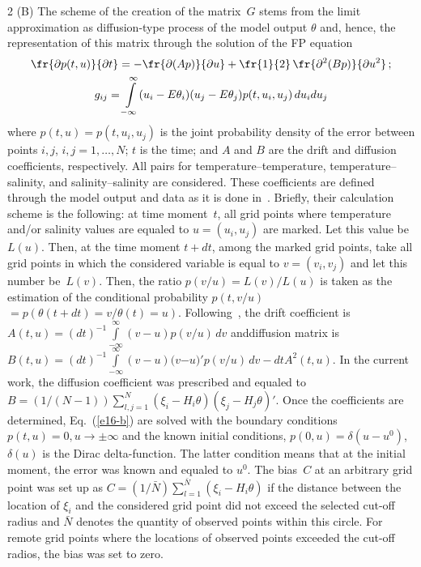 \begin{multicols}{2}
(B) The scheme of the creation of the matrix~$G$ stems from the limit approximation 
as diffusion-type process of the model output $\theta $ and, hence, the representation 
of this matrix through the solution of the FP equation
\begin{gather}
\fr{\partial p(t,u)}{\partial t} =-\fr{\partial (Ap)}{\partial u} +\fr{1}{2}\,
\fr{\partial ^{2} (Bp)}{\partial u^{2} } \,;
\label{e16-b}
\\
g_{ij} =\int\limits_{-\infty }^{\infty }(u_{i} -E\theta_{i}  )
(u_{j} -E\theta_{j} )p(t,u_{i} ,u_{j} )\,du_{i} du_{j} \notag
\end{gather}
where $p(t,u)=p(t,u_{i} ,u_{j} )$ is the joint probability density of the error between 
points $i,j$, $i,j=1,\ldots ,N$; $t$ is the time; and $A$ and $B$ are the drift and diffusion 
coefficients, respectively. All pairs for temperature--temperature, temperature--salinity, 
and salinity--salinity are considered. These coefficients are defined through the model 
output and data as it is done in~\cite{6-b}. Briefly, their calculation scheme is the following: 
at time moment~$t$, all grid points where temperature and/or salinity values are equaled 
to $u=(u_{i} ,u_{j} )$ are marked. Let this value be $L(u)$. Then, at the time moment
$t +dt$, among the marked grid points, take all grid points in which the considered 
variable is equal to $v=(v_{i} ,v_{j} )$ and let this number be~$L(v)$. 
Then, the ratio ${p(v/u)=L(v)/L(u)}$ is taken as the\linebreak
estimation of the conditional 
probability $p(t,v/u)$\linebreak $=p(\theta (t+dt)=v/\theta (t)=u).$ 
Following~\cite{4-b}, the drift coefficient is 
$A(t,u)=(dt)^{-1} \int\limits_{-\infty }^{\infty }(v-u )p(v/u)\,dv$ 
and\linebreak diffusion matrix is $B(t,u)=(dt)^{-1} \int\limits_{-\infty }^{\infty }
(v-u )(v$\linebreak $-u)'p(v/u)\,dv- dtA^{2} (t,u)$.
In the current work, the diffusion coefficient was prescribed and 
equaled to $B=({1}/(N-1)) \sum\limits_{l,j=1}^{N}(\xi_{i}  -H_{i} \theta )(\xi_{j} -H_{j} 
\theta )'$. Once the coefficients are determined, Eq.~(\ref{e16-b}) are solved with the boundary 
conditions $p(t,u)=0,u\to \pm \infty $ and the known initial conditions, 
$p(0,u)=\delta (u-u^{0} )$, $\delta (u)$ is the Dirac delta-function. 
The latter condition means that at the initial moment, the error was known and 
equaled to $u^{0} $. The bias~$C$ at an arbitrary grid point was set up 
as  $C=({1}/{\bar{N}}) \sum\limits_{l=1}^{\bar{N}}(\xi_{i}  -H_{i} \theta )$ 
if the distance between the location of $\xi_{i} $ and the considered grid point 
did not exceed the selected cut-off radius and $\bar{N}$ denotes the quantity 
of observed points within this circle. For remote grid points where the locations 
of observed points exceeded the cut-off radios, the bias was set to zero.


\end{multicols}
